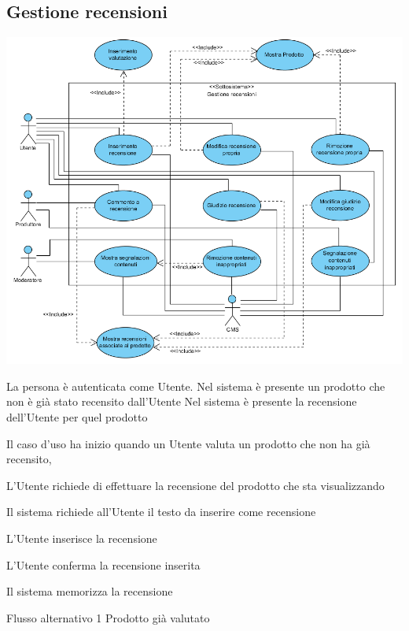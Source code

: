 \subsection{Gestione recensioni}
\begin{center}
   \includegraphics[width=\textwidth]{assets/visualParadigm/cu/GestioneRecensioni}
\end{center}
{}
{La persona è autenticata come Utente. Nel sistema è presente un prodotto che non è già stato recensito dall'Utente}
{Nel sistema è presente la recensione dell'Utente per quel prodotto}
{\begin{enumCU}
	\item Il caso d'uso ha inizio quando un Utente valuta un prodotto che non ha già recensito, \label{insrec0}
	\item L'Utente richiede di effettuare la recensione del prodotto che sta visualizzando
	\item Il sistema richiede all'Utente il testo da inserire come recensione
	\item L'Utente inserisce la recensione\label{addrec:3}
	\item L'Utente conferma la recensione inserita
	\item Il sistema memorizza la recensione
\end{enumCU}}
%
{Flusso alternativo 1}%
{Prodotto già valutato}%
